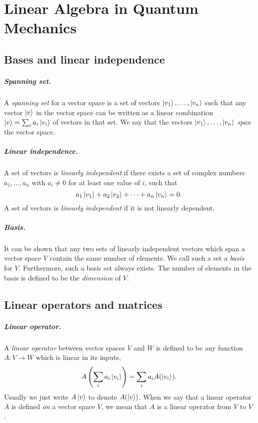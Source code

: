 \chapter{Linear Algebra in Quantum Mechanics}

\section{Bases and linear independence}

\paragraph{Spanning set.} A \emph{spanning set} for a vector space is a set of
vectors $\ket{v_1}, \ldots, \ket{v_n}$ such that any vector $\ket{v}$ in the
vector space can be written as a linear combination $\ket{v} = \sum_i a_i
\ket{v_i}$ of vectors in that set. We say that the vectors $\ket{v_1}, \ldots,
\ket{v_n}$ \emph{span} the vector space.

\paragraph{Linear independence.} A set of vectors is \emph{linearly
independent} if there exists a set of complex numbers $a_1, \ldots, a_n$ with
$a_i \neq 0$ for at least one value of $i$, such that \begin{equation}
  a_1\ket{v_1} + a_2\ket{v_2} + \cdots + a_n\ket{v_n} = 0. \label{eq:lin-ind}
\end{equation} A set of vectors is \emph{linearly independent} if it is not
linearly dependent.

\paragraph{Basis.} It can be shown that any two sets of linearly independent
vectors which span a vector space $V$ contain the same number of elements. We
call such a set a \emph{basis} for $V$. Furthermore, such a basis set always
exists. The number of elements in the basis is defined to be the
\emph{dimension} of $V$.

\section{Linear operators and matrices}

\paragraph{Linear operator.} A \emph{linear operator} between vector spaces $V$
and $W$ is defined to be any function $A : V \rightarrow W$ which is linear in
its inputs, \begin{equation}
  A\left(\sum_i a_i\ket{v_i} \right) = \sum_i a_i A(\ket{v_i}).
    \label{eq:lin-op}
\end{equation} Usually we just write $A\ket{v}$ to denote $A(\ket{v})$. When we
say that a linear operator $A$ is defined \emph{on} a vector space $V$, we mean
that $A$ is a linear operator from $V$ to $V$.

